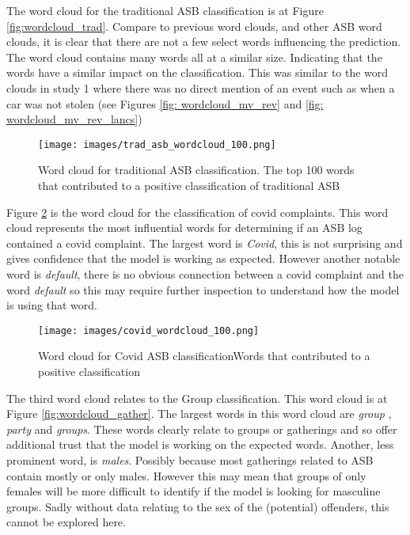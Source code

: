 The word cloud for the traditional ASB classification is at Figure \ref{fig:wordcloud_trad}. Compare to previous word clouds, and other ASB word clouds, it is clear that there are not a few select words influencing the prediction. The word cloud contains many words all at a similar size. Indicating that the words have a similar impact on the classification. This was similar to the word clouds in study 1 where there was no direct mention of an event such as when a car was not stolen (see Figures \ref{fig: wordcloud_mv_rev} and \ref{fig: wordcloud_mv_rev_lancs})

\begin{figure}[h]
    \texttt{[image: images/trad\_asb\_wordcloud\_100.png]}
    \caption{{Word cloud for traditional ASB classification.} The top 100 words that contributed to a positive classification of traditional ASB}
    \label{fig: wordcloud_trad}
\end{figure}

Figure \ref{fig: wordcloud_covid} is the word cloud for the classification of covid complaints. This word cloud represents the most influential words for determining if an ASB log contained a covid complaint. The largest word is \emph{Covid}, this is not surprising and gives confidence that the model is working as expected. However another notable word is \emph{default}, there is no obvious connection between a covid complaint and the word \emph{default}  so this may require further inspection to understand how the model is using that word.


\begin{figure}[h]
    \centering
    \texttt{[image: images/covid\_wordcloud\_100.png]}
    \caption{{Word cloud for Covid ASB classification}Words that contributed to a positive classification}
    \label{fig: wordcloud_covid}
\end{figure}

The third word cloud relates to the Group classification. This word cloud is at Figure \ref{fig:wordcloud_gather}. The largest words in this word cloud are \emph{group} , \emph{party} and \emph{groups}. These words clearly relate to groups or gatherings and so offer additional trust that the model is working on the expected words. Another, less prominent word, is \emph{males}. Possibly because most gatherings related to ASB contain mostly or only males. However this may mean that groups of only females will be more difficult to identify if the model is looking for masculine groups. Sadly without data relating to the sex of the (potential) offenders, this cannot be explored here. 



